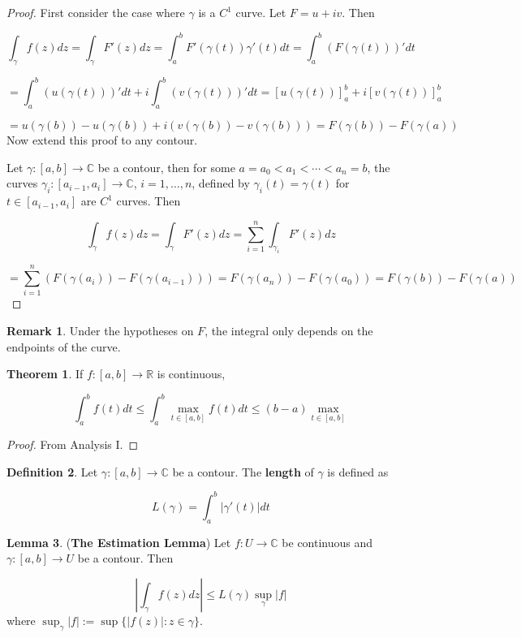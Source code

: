 \documentclass[12pt,a4paper]{article}
\theoremstyle{definition}
\newtheorem{definition}{Definition}[subsection]
\newtheorem{theorem}[definition]{Theorem}
\newtheorem{lemma}[definition]{Lemma}
\newtheorem*{remark}{Remark}
\begin{document}
\begin{proof}
	First consider the case where $\gamma$ is a $C^1$ curve. Let $F = u + iv$. Then

	\[ \int_{\gamma} f(z) dz = \int_{\gamma} F'(z) dz = \int_a^b F'(\gamma(t)) \gamma'(t) dt = \int_a^b (F(\gamma(t)))' dt\]

	\[ = \int_a^b (u(\gamma(t)))' dt + i \int_a^b (v(\gamma(t)))' dt = {[u(\gamma(t))]}_a^b + i {[v(\gamma(t))]}_a^b \]

	\[ = u(\gamma(b)) - u(\gamma(b)) + i(v(\gamma(b)) - v(\gamma(b))) = F(\gamma(b)) - F(\gamma(a)) \]
	Now extend this proof to any contour.

	Let $\gamma: [a, b] \rightarrow \mathbb{C}$ be a contour, then for some $a = a_0 < a_1 < \cdots < a_n = b$, the curves $\gamma_i: [a_{i - 1}, a_i] \rightarrow \mathbb{C}$, $i = 1, \ldots, n$, defined by $\gamma_i(t) = \gamma(t)$ for $t \in [a_{i - 1}, a_i]$ are $C^1$ curves. Then

	\[ \int_{\gamma} f(z) dz = \int_{\gamma} F'(z) dz = \sum_{i = 1}^n \int_{\gamma_i} F'(z) dz \]

	\[ = \sum_{i = 1}^n (F(\gamma(a_i)) - F(\gamma(a_{i - 1}))) = F(\gamma(a_n)) - F(\gamma(a_0)) = F(\gamma(b)) - F(\gamma(a)) \]
\end{proof}

\begin{remark}
	Under the hypotheses on $F$, the integral only depends on the endpoints of the curve.
\end{remark}

\begin{theorem}
	If $f: [a, b] \rightarrow \mathbb{R}$ is continuous,
	
	\[\int_a^b f(t) dt \le \int_a^b \max_{t \in [a, b]} f(t) dt \le (b - a) \max_{t \in [a, b]}\]
\end{theorem}

\begin{proof}
	From Analysis I.
\end{proof}

\begin{definition}
	Let $\gamma: [a, b] \rightarrow \mathbb{C}$ be a contour. The \textbf{length} of $\gamma$ is defined as

	\[L(\gamma) = \int_a^b |\gamma'(t)| dt\]
\end{definition}

\begin{lemma}
	(\textbf{The Estimation Lemma}) Let $f: U \rightarrow \mathbb{C}$ be continuous and $\gamma: [a, b] \rightarrow U$ be a contour. Then

	\[ \left | \int_{\gamma} f(z) dz \right | \le L(\gamma) \sup_{\gamma} |f| \]
	where $\sup_{\gamma} |f| := \sup \{ |f(z)|: z \in \gamma \}$.
\end{lemma}
\end{document}
